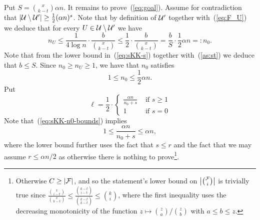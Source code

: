 \documentclass[11pt]{article}
\makeatletter
\renewenvironment{proof}[1][\proofname]
{\par\pushQED{\qed}
	\normalfont\topsep6\p@\@plus6\p@\relax\trivlist
	\item[\hskip\labelsep\bfseries#1\@addpunct{.}]
	\ignorespaces}
{\popQED\endtrivlist\@endpefalse}
\newcommand{\FF}{{\cal F}}
\newcommand{\UU}{{\cal U}}
\renewcommand{\a}{\alpha}
\makeatother
\begin{document}
\begin{proof}[Proof of Theorem~\ref{th:skk}]
	Put $S = {\binom{x}{k-t}} \a n$. 
	It remains to prove~(\ref{eq:goal}). 
	Assume for contradiction that $|\UU \setminus \UU'| \ge \frac12(\a n)^s$.
	Note that by definition of $\UU'$ together with~(\ref{eq:F_U}) 
we deduce that for every $U \in \UU \setminus \UU'$ we have 
	$$
n_U \le \frac{1}{4 \log n} \cdot \frac{b}{\binom{x}{k-t}} \leq
\frac12\cdot\frac{b}{\binom{x}{k-t}} = \frac{b}{S} \cdot \frac12\a n =: n_0.
$$
	Note that from the lower bound in~(\ref{eq:sKK-s}) together with~(\ref{as:st}) we deduce that $b \le S$.
	Since $n_0 \ge n_U \ge 1$, we have that $n_0$ satisfies
	\begin{equation}\label{eq:sKK-n0-bounds}
	1 \le n_0 \le \frac12 \a n .
	\end{equation}
	Put
	\begin{equation}\label{eq:sKK-ell}
	\ell = \frac12\cdot\begin{cases}
	\frac{\a n}{n_0+s} 	& \text{ if } s \ge 1\\
	1					& \text{ if } s = 0
	\end{cases}
	\end{equation}
	Note that~(\ref{eq:sKK-n0-bounds}) implies 
	\begin{equation}\label{eq:sKK-l-bounds}
	1 \le \frac{\a n}{n_0+s} \le \a n ,
	\end{equation}
	where the lower bound further uses the fact that $s \le r$ and the fact that we may assume $r \le \a n/2$ as otherwise there is nothing to prove\footnote{Otherwise $C \ge |\FF|$, and so the statement's lower bound on $\big|\binom{\FF}{i}\big|$ is trivially true since $\frac{\binom{x}{i-t}}{\binom{x}{k-t}} \le \frac{\binom{k-t}{i-t}}{\binom{k-t}{k-t}} \le \binom{k}{i}$, where the first inequality uses the decreasing monotonicity of the function $z \mapsto \binom{z}{a}/\binom{z}{b}$ with $a \le b \le z$.}.

\end{proof}
\end{document}
